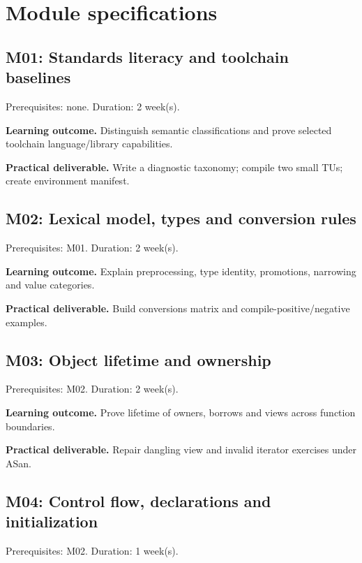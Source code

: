 \documentclass[11pt]{article}
\begin{document}
\section{Module specifications}
\subsection{M01: Standards literacy and toolchain baselines}
Prerequisites: none. Duration: 2 week(s).

\textbf{Learning outcome.} Distinguish semantic classifications and prove selected toolchain language/library capabilities.

\textbf{Practical deliverable.} Write a diagnostic taxonomy; compile two small TUs; create environment manifest.

\subsection{M02: Lexical model, types and conversion rules}
Prerequisites: M01. Duration: 2 week(s).

\textbf{Learning outcome.} Explain preprocessing, type identity, promotions, narrowing and value categories.

\textbf{Practical deliverable.} Build conversions matrix and compile-positive/negative examples.

\subsection{M03: Object lifetime and ownership}
Prerequisites: M02. Duration: 2 week(s).

\textbf{Learning outcome.} Prove lifetime of owners, borrows and views across function boundaries.

\textbf{Practical deliverable.} Repair dangling view and invalid iterator exercises under ASan.

\subsection{M04: Control flow, declarations and initialization}
Prerequisites: M02. Duration: 1 week(s).
\end{document}
